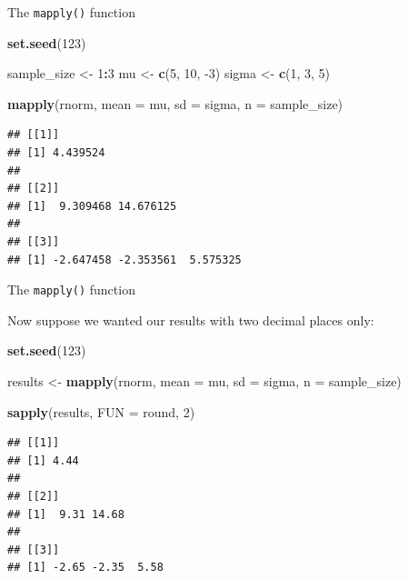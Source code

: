 \documentclass[ignorenonframetext,]{beamer}
\newenvironment{Shaded}{\begin{snugshade}}{\end{snugshade}}
\newcommand{\DataTypeTok}[1]{\textcolor[rgb]{0.13,0.29,0.53}{#1}}
\newcommand{\DecValTok}[1]{\textcolor[rgb]{0.00,0.00,0.81}{#1}}
\newcommand{\KeywordTok}[1]{\textcolor[rgb]{0.13,0.29,0.53}{\textbf{#1}}}
\newcommand{\NormalTok}[1]{#1}
\newcommand{\OperatorTok}[1]{\textcolor[rgb]{0.81,0.36,0.00}{\textbf{#1}}}
\newcommand{\StringTok}[1]{\textcolor[rgb]{0.31,0.60,0.02}{#1}}
\begin{document}
\begin{frame}[fragile]{The \texttt{mapply()} function}
\protect\hypertarget{the-mapply-function-7}{}

\begin{Shaded}
\begin{Highlighting}[]
\KeywordTok{set.seed}\NormalTok{(}\DecValTok{123}\NormalTok{)}

\NormalTok{sample_size <-}\StringTok{ }\DecValTok{1}\OperatorTok{:}\DecValTok{3}
\NormalTok{mu <-}\StringTok{ }\KeywordTok{c}\NormalTok{(}\DecValTok{5}\NormalTok{, }\DecValTok{10}\NormalTok{, }\DecValTok{-3}\NormalTok{)}
\NormalTok{sigma <-}\StringTok{ }\KeywordTok{c}\NormalTok{(}\DecValTok{1}\NormalTok{, }\DecValTok{3}\NormalTok{, }\DecValTok{5}\NormalTok{)}

\KeywordTok{mapply}\NormalTok{(rnorm, }\DataTypeTok{mean =}\NormalTok{ mu, }\DataTypeTok{sd =}\NormalTok{ sigma, }\DataTypeTok{n =}\NormalTok{ sample_size)}
\end{Highlighting}
\end{Shaded}

\begin{verbatim}
## [[1]]
## [1] 4.439524
## 
## [[2]]
## [1]  9.309468 14.676125
## 
## [[3]]
## [1] -2.647458 -2.353561  5.575325
\end{verbatim}

\end{frame}

\begin{frame}[fragile]{The \texttt{mapply()} function}
\protect\hypertarget{the-mapply-function-8}{}

Now suppose we wanted our results with two decimal places only:

\begin{Shaded}
\begin{Highlighting}[]
\KeywordTok{set.seed}\NormalTok{(}\DecValTok{123}\NormalTok{)}

\NormalTok{results <-}\StringTok{ }\KeywordTok{mapply}\NormalTok{(rnorm, }\DataTypeTok{mean =}\NormalTok{ mu, }\DataTypeTok{sd =}\NormalTok{ sigma,}
                  \DataTypeTok{n =}\NormalTok{ sample_size)}
\end{Highlighting}
\end{Shaded}

\begin{Shaded}
\begin{Highlighting}[]
\KeywordTok{sapply}\NormalTok{(results, }\DataTypeTok{FUN =}\NormalTok{ round, }\DecValTok{2}\NormalTok{)}
\end{Highlighting}
\end{Shaded}

\begin{verbatim}
## [[1]]
## [1] 4.44
## 
## [[2]]
## [1]  9.31 14.68
## 
## [[3]]
## [1] -2.65 -2.35  5.58
\end{verbatim}

\end{frame}
\end{document}
